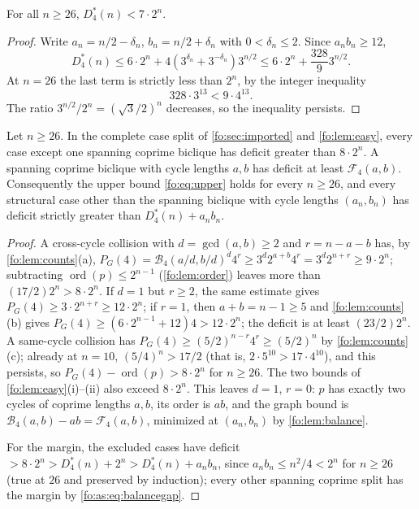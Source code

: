 \documentclass[11pt,a4paper]{article}
\numberwithin{equation}{section}
\theoremstyle{definition}
\theoremstyle{remark}
\newcommand{\ord}{\operatorname{ord}}
\newcommand{\Bip}{\mathcal B}
\begin{document}
\begin{lemma}\label{fo:as:lem:target}
For all $n\ge26$, $D^*_4(n)<7\cdot2^n$.
\end{lemma}

\begin{proof}
Write $a_n=n/2-\delta_n$, $b_n=n/2+\delta_n$ with $0<\delta_n\le2$. Since
$a_nb_n\ge12$,
\[
 D^*_4(n)\le6\cdot2^n+4(3^{\delta_n}+3^{-\delta_n})3^{n/2}
 \le6\cdot2^n+\frac{328}{9}3^{n/2}.
\]
At $n=26$ the last term is strictly less than $2^n$, by the integer inequality
\begin{equation}\label{fo:as:eq:threshold26}
 328\cdot3^{13}<9\cdot4^{13}.
\end{equation}
The ratio $3^{n/2}/2^n=(\sqrt3/2)^n$ decreases, so the inequality persists.
\end{proof}

\begin{proposition}\label{fo:as:prop:tail}
Let $n\ge26$. In the complete case split of \cref{fo:sec:imported} and
\cref{fo:lem:easy}, every case except one spanning coprime biclique has
deficit greater than $8\cdot2^n$. A spanning coprime biclique with cycle
lengths $a,b$ has deficit at least $\mathcal F_4(a,b)$. Consequently the upper
bound \eqref{fo:eq:upper} holds for every $n\ge26$, and every structural case
other than the spanning biclique with cycle lengths $(a_n,b_n)$ has deficit
strictly greater than $D^*_4(n)+a_nb_n$.
\end{proposition}

\begin{proof}
A cross-cycle collision with $d=\gcd(a,b)\ge2$ and $r=n-a-b$ has, by
\cref{fo:lem:counts}(a), $P_G(4)=\Bip_4(a/d,b/d)^d4^r\ge3^d2^{a+b}4^r=3^d2^{n+r}\ge9\cdot2^n$;
subtracting $\ord(p)\le2^{n-1}$ (\cref{fo:lem:order}) leaves more than
$(17/2)2^n>8\cdot2^n$. If $d=1$ but $r\ge2$, the same estimate gives
$P_G(4)\ge3\cdot2^{n+r}\ge12\cdot2^n$; if $r=1$, then $a+b=n-1\ge5$ and
\cref{fo:lem:counts}(b) gives $P_G(4)\ge(6\cdot2^{n-1}+12)4>12\cdot2^n$; the
deficit is at least $(23/2)2^n$. A same-cycle collision has
$P_G(4)\ge(5/2)^{n-r}4^r\ge(5/2)^n$ by \cref{fo:lem:counts}(c); already at
$n=10$, $(5/4)^n>17/2$ (that is, $2\cdot5^{10}>17\cdot4^{10}$), and this
persists, so $P_G(4)-\ord(p)>8\cdot2^n$ for $n\ge26$. The two bounds of
\cref{fo:lem:easy}(i)--(ii) also exceed $8\cdot2^n$. This leaves $d=1$,
$r=0$: $p$ has exactly two cycles of coprime lengths $a,b$, its order is
$ab$, and the graph bound is $\Bip_4(a,b)-ab=\mathcal F_4(a,b)$, minimized
at $(a_n,b_n)$ by \cref{fo:lem:balance}.

For the margin, the excluded cases have deficit
$>8\cdot2^n>D^*_4(n)+2^n>D^*_4(n)+a_nb_n$, since
$a_nb_n\le n^2/4<2^n$ for $n\ge26$ (true at $26$ and preserved by induction);
every other spanning coprime split has the margin by
\eqref{fo:as:eq:balancegap}.
\end{proof}
\end{document}
